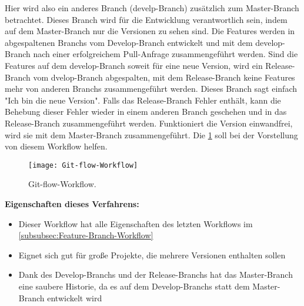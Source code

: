 Hier wird also ein anderes Branch (develp-Branch) zusätzlich zum Master-Branch betrachtet. Dieses Branch wird für die Entwicklung verantwortlich sein, indem auf dem Master-Branch 			nur die Versionen zu sehen sind. Die Features werden in abgespaltenen Branchs vom Develop-Branch entwickelt und mit dem develop-Branch nach einer erfolgreichem Pull-Anfrage 				zusammengeführt werden. Sind die Features auf dem develop-Branch soweit für eine neue Version, wird ein Release-Branch vom dvelop-Branch abgespalten, mit dem Release-Branch keine 			Features mehr von anderen Branchs zusammengeführt werden. Dieses Branch sagt einfach "Ich bin die neue Version". Falls das Release-Branch Fehler enthält, kann die Behebung dieser			Fehler wieder in einem anderen Branch geschehen und in das Release-Branch zusammengeführt werden. Funktioniert die Version einwandfrei, wird sie mit dem Master-Branch 						zusammengeführt. Die \cref{fig:Git-flow-Workflow} soll bei der Vorstellung von diesem Workflow helfen.

\begin{figure}[H]
	\centering
	\texttt{[image: Git-flow-Workflow]}
	\caption[Git-flow-Workflow]{Git-flow-Workflow.\\ \cite{Git-flow-Workflow}}
	\label{fig:Git-flow-Workflow}
\end{figure}
	
\textbf{Eigenschaften dieses Verfahrens:}
\begin{itemize}
	\item Dieser Workflow hat alle Eigenschaften des letzten Workflows im \ref{subsubsec:Feature-Branch-Workflow}
	\item Eignet sich gut für große Projekte, die mehrere Versionen enthalten sollen
	\item Dank des Develop-Branchs und der Release-Branchs hat das Master-Branch eine saubere Historie, da es auf dem Develop-Branchs statt dem Master-Branch entwickelt wird
\end{itemize}

